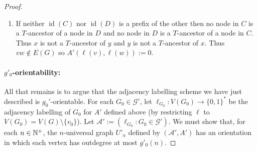 \documentclass{patmorin}
\DeclareMathOperator{\id}{id}
\DeclareMathOperator{\bin}{bin}
\DeclareMathOperator{\idx}{idx}
\newcommand{\calA}{\mathcal{A}}
\newcommand{\calG}{\mathcal{G}}
\begin{document}
\begin{proof}
\begin{enumerate}
\begin{itemize}
      \item If $\alpha(w,u)=\langle 1, \bin(\idx(C')), \rho_{C'}(x'), \mu_{x'}(A_{y'}\setminus A_{x'}), \kappa_{x'}(A_{y'}\setminus A_{x'}, u)\rangle$, then $u\in B_{x'}\setminus A_{x'}$ and $C'$ is the component of $F$ that contains $x'$.  In this case, the first $\idx(C')$ parts of $\id(y)$ give $\id(C')$.  Then $\id(x')=\id(C')\circ\rho_{C'}(x')$.  The tester first checks that $\id(x')=\id(x)$.  If not, then $x'\neq x$ and $u\neq v$ since $u\in B_{x'}\setminus A_{x'}$ and $v\in B_x\setminus A_x$. If $\id(x')=\id(x)$ then $x'=x$ since $\id$ is injective.  In this case, the tester can check if $u=v$ by checking if $I(\mu_{x'}(A_{y'}\setminus A_{x'}),\kappa_{x'}(A_{y'}\setminus A_{x'}, u), \mu_{x}(v))=1$.  If so, then $v=u\in N_G(w)$ so the tester outputs $A'(\ell(v),\ell(w)):=1$.  If not, the tester continues with the next entry (if any) in $\alpha(w)$.
    \end{itemize}

    \item If neither $\id(C)$ nor $\id(D)$ is a prefix of the other then no node in $C$ is a $T$-ancestor of a node in $D$ and no node in $D$ is a $T$-ancestor of a node in $C$.  Thus $x$ is not a $T$-ancestor of $y$ and $y$ is not a $T$-ancestor of $x$.  Thus $vw\not\in E(G)$ so $A'(\ell(v),\ell(w)):=0$.
  \end{enumerate}

  \paragraph{\boldmath $g'_0$-orientability:}

  All that remains is to argue that the adjacency labelling scheme we have just described is $g_0'$-orientable.  For each $G_0\in\calG'$, let $\ell_{G_0}:V(G_0)\to\{0,1\}^*$ be the adjacency labelling of $G_0$ for $A'$ defined above (by restricting $\ell$ to $V(G_0)=V(G)\setminus\{v_0\}$). Let $\calA':=(\ell_{G_0}: G_0\in\calG')$.  We must show that, for each $n\in\mathbb{N}^+$, the $n$-universal graph $U'_n$ defined by $(\calA',A')$ has an orientation in which each vertex has outdegree at most $g'_0(n)$.


\end{proof}
\end{document}
